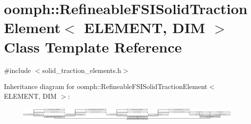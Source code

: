 \hypertarget{classoomph_1_1RefineableFSISolidTractionElement}{}\section{oomph\+:\+:Refineable\+F\+S\+I\+Solid\+Traction\+Element$<$ E\+L\+E\+M\+E\+NT, D\+IM $>$ Class Template Reference}
\label{classoomph_1_1RefineableFSISolidTractionElement}


{\ttfamily \#include $<$solid\+\_\+traction\+\_\+elements.\+h$>$}

Inheritance diagram for oomph\+:\+:Refineable\+F\+S\+I\+Solid\+Traction\+Element$<$ E\+L\+E\+M\+E\+NT, D\+IM $>$\+:\begin{figure}[H]
\begin{center}
\leavevmode
\includegraphics[height=0.748663cm]{classoomph_1_1RefineableFSISolidTractionElement}
\end{center}
\end{figure}
